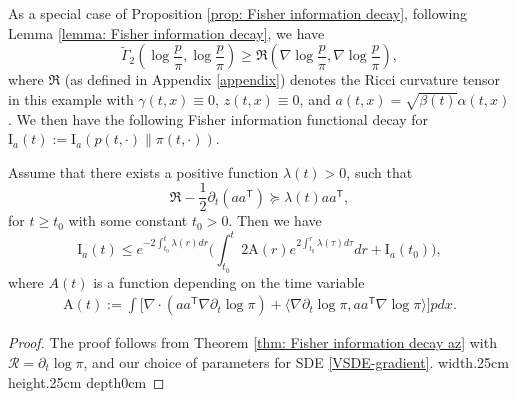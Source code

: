 \documentclass[11pt,reqno]{amsart}
\newcommand{\la}{\langle}
\newcommand{\ra}{\rangle}
\newcommand{\ts}{\mathsf{T}}
\newcommand{\bea}{\begin{eqnarray}}
\newcommand{\eea}{\end{eqnarray}}
\newcommand{\beaa}{\begin{eqnarray*}}
\newcommand{\eeaa}{\end{eqnarray*}}
\def\pa{\partial}
\def\qed{ \hfill \vrule width.25cm height.25cm depth0cm\smallskip}
\begin{document}
As a special case of Proposition \ref{prop: Fisher information decay}, following Lemma \ref{lemma: Fisher information decay}, we have
\begin{equation*}
\widetilde \Gamma_{2}(\log\frac{{p} }{\pi},\log\frac{{p} }{\pi})\ge \mathfrak{R}(\nabla \log\frac{{p} }{\pi},\nabla \log\frac{{p} }{\pi}), 
\end{equation*}
where $\mathfrak R$ (as defined in Appendix \ref{appendix}) denotes the Ricci curvature tensor in this example with $\gamma(t,x)\equiv 0$, $z(t,x)\equiv 0$, and $a(t,x)=\sqrt{\beta(t)}\alpha(t,x)$.
We then have the following Fisher information functional decay for $\mathrm I_a(t):=\mathrm I_{a}({p} (t,\cdot)\|\pi(t,\cdot))$. 
\begin{theorem}\label{thm: Fisher information decay1}
Assume that there exists a positive function $\lambda(t)>0$, such that
\begin{equation}\label{LSI condition}
   \mathfrak R -\frac{1}{2}\partial_t(aa^{\ts}) 
    \succeq \lambda(t) aa^{\ts},
\end{equation}
for $t\ge t_0$ with some constant $t_0>0$.
Then we have
\begin{equation*}
    \mathrm I_{a}(t)\leq  e^{-2\int_{t_0}^t \lambda(r)dr}\Big(\int_{t_0}^t 2\mathrm A(r)e^{2\int_{t_0}^r\lambda(\tau)d\tau} dr+\mathrm I_a(t_0)\Big),
\end{equation*}
where $A(t)$ is a function depending on the time variable
\bea 
\mathrm A(t):=\int\big[ 
	\nabla\cdot(aa^{\ts}\nabla \pa_t\log\pi)+\la \nabla \pa_t\log\pi, aa^{\ts}\nabla\log\pi\ra \big]{p}  dx.
 \eea 
\end{theorem}
\begin{proof}
The proof follows from Theorem \ref{thm: Fisher information decay az} with $\mathcal R= \partial_t \log \pi$, and our choice of parameters for SDE \eqref{VSDE-gradient}.
\qed 
\end{proof}
\end{document}
